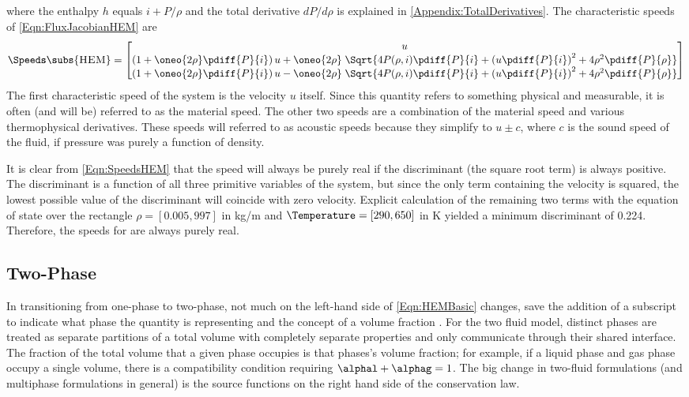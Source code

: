 where the enthalpy $h$ equals $i + P/\rho$ and the total derivative $dP/d\rho$ is explained in \cref{Appendix:TotalDerivatives}.
The characteristic speeds of \cref{Eqn:FluxJacobianHEM} are
\begin{equation}
    \Speeds\subs{\textsc{HEM}} =   \begin{bmatrix}
                    u \\
                    \left(1 + \oneo{2\rho}\pdiff{P}{i}\right)u  + \oneo{2 \rho}\;\Sqrt{4 P(\rho,i) \pdiff{P}{i}+\left(u\pdiff{P}{i}\right)^2 + 4 \rho^2 \pdiff{P}{\rho}} \\
                    \left(1 + \oneo{2\rho}\pdiff{P}{i}\right)u  - \oneo{2 \rho}\;\Sqrt{4 P(\rho,i) \pdiff{P}{i}+\left(u\pdiff{P}{i}\right)^2 + 4 \rho^2 \pdiff{P}{\rho}} \\
                \end{bmatrix}
    \label{Eqn:SpeedsHEM}
\end{equation}
The first characteristic speed of the system is the velocity $u$ itself.
Since this quantity refers to something physical and measurable, it is often (and will be) referred to as the material speed.
The other two speeds are a combination of the material speed and various thermophysical derivatives.
These speeds will referred to as acoustic speeds because they simplify to $u \pm c$, where $c$ is the sound speed of the fluid, if pressure was purely a function of density.

It is clear from \cref{Eqn:SpeedsHEM} that the speed will always be purely real if the discriminant (the square root term) is always positive.
The discriminant is a function of all three primitive variables of the system, but since the only term containing the velocity is squared, the lowest possible value of the discriminant will coincide with zero velocity.
Explicit calculation of the remaining two terms with the equation of state over the rectangle $\rho = [0.005,997]$ in kg/m and $\Temperature = [290,650]$ in K yielded a minimum discriminant of 0.224.
Therefore, the speeds for  are always purely real.


\subsection{Two-Phase}
In transitioning from one-phase to two-phase, not much on the left-hand side of \cref{Eqn:HEMBasic} changes, save the addition of a subscript to indicate what phase the quantity is representing and the concept of a volume fraction \alpha.
For the two fluid model, distinct phases are treated as separate partitions of a total volume with completely separate properties and only communicate through their shared interface.
The fraction of the total volume that a given phase occupies is that phases's volume fraction; for example, if a liquid phase and gas phase occupy a single volume, there is a compatibility condition requiring $\alphal + \alphag = 1$.
The big change in two-fluid formulations (and multiphase formulations in general) is the source functions on the right hand side of the conservation law.

